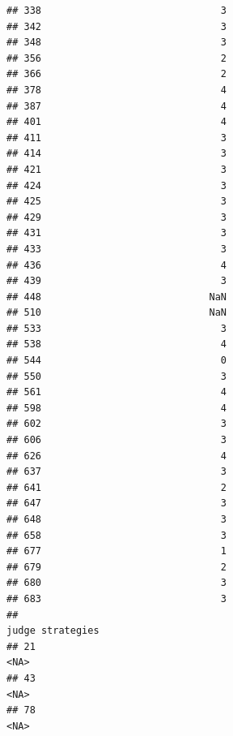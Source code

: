 \documentclass[
]{article}
\begin{document}
\begin{verbatim}
## 338                               3
## 342                               3
## 348                               3
## 356                               2
## 366                               2
## 378                               4
## 387                               4
## 401                               4
## 411                               3
## 414                               3
## 421                               3
## 424                               3
## 425                               3
## 429                               3
## 431                               3
## 433                               3
## 436                               4
## 439                               3
## 448                             NaN
## 510                             NaN
## 533                               3
## 538                               4
## 544                               0
## 550                               3
## 561                               4
## 598                               4
## 602                               3
## 606                               3
## 626                               4
## 637                               3
## 641                               2
## 647                               3
## 648                               3
## 658                               3
## 677                               1
## 679                               2
## 680                               3
## 683                               3
##                                                                                                                                                                                                                                                                                                                                        judge strategies
## 21                                                                                                                                                                                                                                                                                                                                                 <NA>
## 43                                                                                                                                                                                                                                                                                                                                                 <NA>
## 78                                                                                                                                                                                                                                                                                                                                                 <NA>

\end{verbatim}
\end{document}
